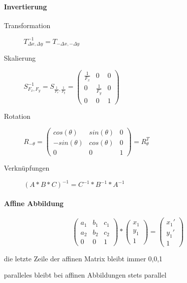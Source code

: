 \documentclass[landscape]{article}
\begin{document}
\begin{multicols}{3}
  \paragraph{Invertierung}
  \begin{description}
    \item[Transformation]  $T_{\Delta x, \Delta y}^{-1} = T_{-\Delta x, -\Delta y}$
    \item[Skalierung] $S_{F_x, F_y}^{-1}=S_{\frac{1}{F_x},\frac{1}{F_y}}=\begin{pmatrix} \frac{1}{F_x} &0&0\\ 0&\frac{1}{F_y}&0\\ 0&0&1 \end{pmatrix}$
    \item[Rotation] $R_{-\theta} = \begin{pmatrix} cos(\theta) & sin(\theta) & 0 \\ -sin(\theta) & cos(\theta) & 0 \\ 0 & 0 & 1 \end{pmatrix} = R_{\theta}^{T}$
    \item[Verknüpfungen] $(A*B*C)^{-1}=C^{-1}*B^{-1}*A^{-1}$
  \end{description}
  
  \paragraph{Affine Abbildung}
  $$\begin{pmatrix}a_1 & b_1 & c_1\\a_2 &b_2 & c_2\\ 0&0&1\end{pmatrix}*\begin{pmatrix} x_1\\y_1\\1\end{pmatrix}= \begin{pmatrix}x_1'\\y_1'\\1 \end{pmatrix}$$
  \begin{itemize*}
    \item die letzte Zeile der affinen Matrix bleibt immer 0,0,1
    \item paralleles bleibt bei affinen Abbildungen stets parallel
  \end{itemize*}
  

\end{multicols}
\end{document}
